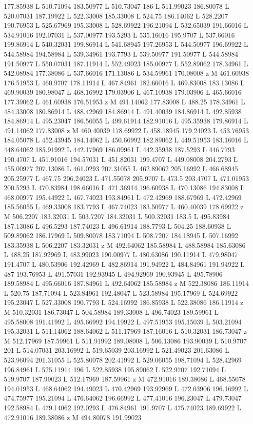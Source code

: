 {\begin{scope}[local bounding box=bb]
{177.85938 L 510.71094 183.50977 L 510.73047 186 L 511.99023 186.80078 L 520.07031 187.19922 L 522.33008 185.33008 L 524.75 186.14062 L 528.2207 190.76953 L 525.67969 195.33008 L 528.69922 196.21094 L 532.65039 191.66016 L 534.91016 192.07031 L 537.00977 193.5293 L 535.16016 195.9707 L 537.66016 199.86914 L 540.32031 199.86914 L 541.68945 197.26953 L 544.50977 196.69922 L 544.58984 194.58984 L 539.34961 193.7793 L 539.50977 191.50977 L 544.58984 191.50977 L 550.07031 187.11914 L 552.49023 185.00977 L 552.89062 178.34961 L 542.08984 177.38086 L 537.66016 171.13086 L 534.59961 170.08008 z M 461.60938 176.51953 L 460.9707 178.11914 L 467.84961 182.66016 L 469.83008 183.13086 L 469.90039 180.98047 L 468.16992 179.03906 L 467.10938 179.03906 L 465.66016 177.39062 L 461.60938 176.51953 z M 491.14062 177.83008 L 488.25 178.34961 L 484.33008 180.86914 L 488.42969 184.86914 L 491.40039 184.86914 L 492.85938 184.86914 L 495.23047 186.56055 L 499.61914 182.91016 L 495.35938 179.86914 L 491.14062 177.83008 z M 460.40039 178.69922 L 458.18945 179.24023 L 453.76953 184.05078 L 452.43945 184.14062 L 450.66992 182.89062 L 449.51953 183.16016 L 448.64062 185.91992 L 442.17969 186.09961 L 442.35938 187.5293 L 446.7793 190.4707 L 451.91016 194.57031 L 451.82031 199.4707 L 449.08008 204.2793 L 455.00977 207.13086 L 461.0293 207.31055 L 462.89062 205.16992 L 466.68945 205.25977 L 467.75 206.24023 L 471.55078 205.9707 L 473.5 203.4707 L 471.01953 200.5293 L 470.83984 198.66016 L 471.36914 196.60938 L 470.13086 194.83008 L 468.00977 195.44922 L 467.74023 193.84961 L 472.42969 188.67969 L 472.42969 185.56055 L 469.33008 183.7793 L 467.74023 183.50977 L 460.40039 178.69922 z M 506.2207 183.32031 L 503.7207 184.32031 L 500.32031 183.5 L 495.83984 187.13086 L 496.5293 187.74023 L 496.61914 188.7793 L 504.25 188.60938 L 509.89062 186.17969 L 509.80078 183.71094 L 508.7207 184.18945 L 507.16992 183.35938 L 506.2207 183.32031 z M 492.64062 185.58984 L 488.58984 185.63086 L 488.25 187.92969 L 483.99023 190.00977 L 480.63086 190.11914 L 479.98047 191.4707 L 480.53906 192.42969 L 482.86914 191.94922 L 484.84961 191.94922 L 487 193.76953 L 491.57031 192.93945 L 494.92969 190.93945 L 495.78906 189.58984 L 495.66016 187.84961 L 492.64062 185.58984 z M 522.38086 186.11914 L 520.75 187.71094 L 523.84961 192.48047 L 523.58984 195.17969 L 524.69922 195.23047 L 527.33008 190.7793 L 524.16992 186.85938 L 522.38086 186.11914 z M 510.32031 186.73047 L 504.58984 189.33008 L 496.74023 189.59961 L 495.58008 191.41992 L 495.66992 194.19922 L 497.51953 195.15039 L 503.21094 195.32031 L 511.14062 188.64062 L 511.17969 187.16016 L 510.32031 186.73047 z M 512.17969 187.59961 L 511.91992 189.08008 L 506.13086 193.90039 L 510.9707 201 L 514.07031 203.16992 L 519.65039 203.16992 L 521.49023 201.63086 L 523.96094 201.31055 L 525.80078 202.41992 L 529.06055 198.71094 L 528.42969 196.84961 L 525.11914 196 L 522.85938 195.89062 L 522.9707 192.71094 L 519.9707 187.99023 L 512.17969 187.59961 z M 472.91016 189.38086 L 468.55078 194.01953 L 468.64062 194.49023 L 470.42969 193.92969 L 472.03906 196.16992 L 474.75977 195.21094 L 476.64062 196.66992 L 477.41016 196.23047 L 479.73047 192.58984 L 479.14062 192.0293 L 476.84961 191.9707 L 475.74023 189.69922 L 472.91016 189.38086 z M 494.80078 191.99023 }
\end{scope}}
